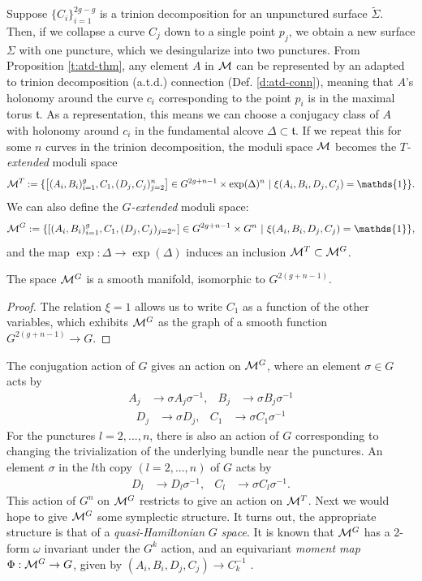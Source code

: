 	Suppose $\{C_i\}_{i=1}^{2g-g}$ is a trinion decomposition for an unpunctured surface $\tilde{\Sigma}$. Then, if we collapse a curve $C_j$ down to a single point $p_j$, we obtain a new surface $\Sigma$ with one puncture, which we desingularize into two punctures. From Proposition \ref{t:atd-thm}, any element $A$ in $\mathcal{M}$ can be represented by an adapted to trinion decomposition (a.t.d.) connection (Def. \ref{d:atd-conn}), meaning that $A$'s holonomy around the curve $c_i$ corresponding to the point $p_i$ is in the maximal torus $\mathfrak{t}$. As a representation, this means we can choose a conjugacy class of $A$ with holonomy around $c_i$ in the fundamental alcove $\Delta \subset \mathfrak{t}$. If we repeat this for some $n$ curves in the trinion decomposition, the moduli space $\mathcal{M}$ becomes the \emph{$T$-extended} moduli space
	\begin{equation}
		\MM^T := \{\left[(A_i,B_i)_{i=1}^{g},C_1,(D_j,C_j)_{j=2}^n\right]\in G^{2g+n-1}\times \exp(\Delta)^n ~|~ \xi(A_i,B_i,D_j,C_j) = \mathds{1}\}.
	\end{equation}
	We can also define the \emph{$G$-extended} moduli space:
	\begin{equation}
	\MM^G := \{\left[(A_i,B_i)_{i=1}^{g},C_1,(D_j,C_j)_{j=2^n}\right]\in G^{2g+n-1}\times G^n ~|~ \xi(A_i,B_i,D_j,C_j) = \mathds{1}\},
	\end{equation}
	and the map $\exp:\Delta\to\exp(\Delta)$ induces an inclusion $\mathcal{M}^T \subset \mathcal{M}^G$.
	\begin{theorem}
		The space $\mathcal{M}^G$ is a smooth manifold, isomorphic to $G^{2(g+n-1)}$.
	\end{theorem}
	\begin{proof}
		The relation $\xi = 1$ allows us to write $C_1$ as a function of the other variables, which exhibits $\mathcal{M}^G$ as the graph of a smooth function $G^{2(g+n-1)}\to G$.
	\end{proof}
	
	The conjugation action of $G$ gives an action on $\mathcal{M}^G$, where an element $\sigma \in G$ acts by
	\begin{align*}
		A_j &\to \sigma A_j \sigma^{-1},& 	B_j&\to \sigma B_j\sigma^{-1}
	\end{align*}
	\begin{align*}
		D_j&\to \sigma D_j, & C_1 &\to \sigma C_1\sigma^{-1}
	\end{align*}
	For the punctures $l=2,...,n$, there is also an action of $G$ corresponding to changing the trivialization of the underlying bundle near the punctures. An element $\sigma$ in the $l$th copy $(l=2,...,n)$ of $G$ acts by
	\begin{align}
	\label{e:impl-action}
	D_l&\to D_l\sigma^{-1}, & C_l &\to \sigma C_l\sigma^{-1}.
	\end{align}
	This action of $G^n$ on $\mathcal{M}^G$ restricts to give an action on $\mathcal{M}^T$. Next we would hope to give $\mathcal{M}^G$ some symplectic structure. It turns out, the appropriate structure is that of a \textit{quasi-Hamiltonian} $G$ \textit{space}. It is known that $\mathcal{M}^G$ has a 2-form $\omega$ invariant under the $G^k$ action, and an equivariant \textit{moment map} $\Phi:\mathcal{M}^G\to G$, given by $(A_i,B_i,D_j,C_j)\to C_k^{-1}$ \cite{alekseev_lie_1998}. 
	
